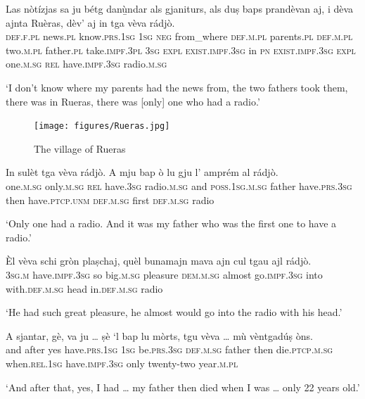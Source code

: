 \begin{linenumbers}
\gll    Las nòtízjas sa ju bétg danù̱ndar als gjaniturs, als duṣ baps prandèvan aj, i dèva ajnta Ruèras, dèv’ aj in tga vèva rádjò. \\
\textsc{def.f.pl} news.\textsc{pl} know.\textsc{prs.1sg} \textsc{1sg} \textsc{neg} from\_where \textsc{def.m.pl} parents.\textsc{pl} \textsc{def.m.pl} two.\textsc{m.pl} father.\textsc{pl} take.\textsc{impf.3pl} \textsc{3sg} \textsc{expl} \textsc{exist.impf.3sg} in \textsc{pn} \textsc{exist.impf.3sg} \textsc{expl}  one.\textsc{m.sg} \textsc{rel} have.\textsc{impf.3sg} radio.\textsc{m.sg}\\
\end{linenumbers}
\medskip
\glt `I don’t know where my parents had the news from, the two fathers took them, there was in Rueras, there was [only] one who had a radio.'
\medskip

 \begin{figure}
	\texttt{[image: figures/Rueras.jpg]}
	\caption{The village of Rueras}
\end{figure}

\begin{linenumbers}
\gll    In sulèt tga vèva rádjò. A mju bap ò lu gju l’ amprém al rádjò.\\
one.\textsc{m.sg} only.\textsc{m.sg} \textsc{rel} have.\textsc{3sg} radio.\textsc{m.sg} and \textsc{poss.1sg.m.sg} father have.\textsc{prs.3sg} then have.\textsc{ptcp.unm} \textsc{def.m.sg} first \textsc{def.m.sg} radio\\
\end{linenumbers}
\medskip
\glt `Only one had a radio. And it was my father who was the first one to have a radio.'
\medskip

\begin{linenumbers}
\gll    Èl vèva schi gròn plaṣchaj, quèl bunamajn mava ajn cul tgau ajl rádjò.\\
 \textsc{3sg.m} have.\textsc{impf.3sg} so big.\textsc{m.sg} pleasure \textsc{dem.m.sg} almost go.\textsc{impf.3sg} into with.\textsc{def.m.sg} head in.\textsc{def.m.sg} radio\\
\end{linenumbers}
\medskip
\glt `He had such great pleasure, he almost would go into the radio with his head.'
\medskip

\begin{linenumbers}
\gll    A sjantar, gè, va ju … ṣè `l bap lu mòrts, tgu vèva … mù vèntgadúṣ òns.\\
and after yes have.\textsc{prs.1sg} \textsc{1sg} {} be.\textsc{prs.3sg} \textsc{def.m.sg} father then die.\textsc{ptcp.m.sg} when.\textsc{rel.1sg} have.\textsc{impf.3sg} {} only twenty-two year.\textsc{m.pl}\\
\end{linenumbers}
\medskip
\glt `And after that, yes, I had … my father then died when I was … only 22 years old.'
\medskip

